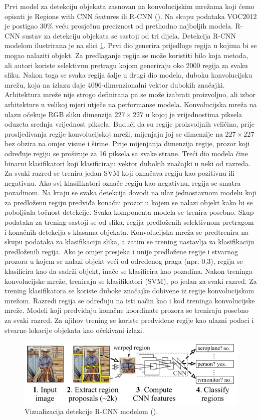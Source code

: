 Prvi model za detekciju objekata zasnovan na konvolucijskim mrežama koji ćemo opisati je Regions with CNN features ili R-CNN (\cite{DBLP:journals/corr/GirshickDDM13}). Na skupu podataka VOC2012 je postigao 30\% veću prosječnu preciznost od prethodno najboljih modela. 
R-CNN sustav za detekciju objekata se sastoji od tri dijela. Detekcija R-CNN modelom ilustrirana je na slici \ref{rcnn}. Prvi dio generira prijedloge regija u kojima bi se mogao nalaziti objekt. Za predlaganje regija se može koristiti bilo koja metoda, ali autori koriste selektivnu pretragu kojom generiraju oko 2000 regija za svaku sliku.
Nakon toga se svaka regija šalje u drugi dio modela, duboku konvolucijsku mrežu, koja na izlazu daje 4096-dimenzionalni vektor dubokih značajki. Arhitektura mreže nije strogo definirana pa se može izabrati proizvoljno, ali izbor arhitekture u velikoj mjeri utječe na performanse modela. Konvolucijska mreža na ulazu očekuje RGB sliku dimenzija $227 \times 227$ u kojoj je vrijednostima piksela oduzeta srednja vrijednost piksela. Budući da su regije proizvoljnih veličina, prije prosljeđivanja regije konvolucijskoj mreži, mijenjaju joj se dimenzije na $227 \times 227$ bez obzira na omjer visine i širine. Prije mijenjanja dimenzija regije, prozor koji određuje regiju se proširuje za 16 piksela sa svake strane.
Treći dio modela čine binarni klasifikatori koji klasificiraju vektor dubokih značajki u neki od razreda. Za svaki razred se trenira jedan SVM koji označava regiju kao pozitivnu ili negativnu. Ako svi klasifikatori označe regiju kao negativnu, regija se smatra pozadinom.
Na kraju se svaka detekcija dovodi na ulaz jednostavnom modelu koji za predloženu regiju predviđa konačni prozor u kojem se nalazi objekt kako bi se poboljšala točnost detekcije.
Svaka komponenta modela se trenira posebno. Skup podataka za trening sastoji se od slika, regija predloženih selektivnom pretragom i konačnih detekcija s klasama objekata.
Konvolucijska mreža se predtrenira na skupu podataka za klasifikaciju slika, a zatim se trening nastavlja za klasifikaciju predloženih regija. Ako je omjer presjeka i unije predložene regije i stvarnog prozora u kojem se nalazi objekt veći od određenog praga (npr. 0.3), regija se klasificira kao da sadrži objekt, inače se klasificira kao pozadina.
Nakon treninga konvolucijske mreže, treniraju se klasifikatori (SVM), po jedan za svaki razred. Za trening klasifikatora se koriste duboke značajke dobivene iz regije konvolucijskom mrežom. Razredi regija se određuju na isti način kao i kod treninga konvolucijske mreže.
Modeli koji predviđaju konačne koordinate prozora se treniraju posebno za svaki razred. Za njihov trening se koriste predviđene regije kao ulazni podaci i stvarne lokacije objekata kao očekivani izlazi.

 \begin{figure}
	\centering
	\includegraphics[scale=1]{img/rcnn.png}
	\caption{Vizualizacija detekcije R-CNN modelom (\cite{DBLP:journals/corr/GirshickDDM13}).}
	\label{rcnn}
\end{figure}

